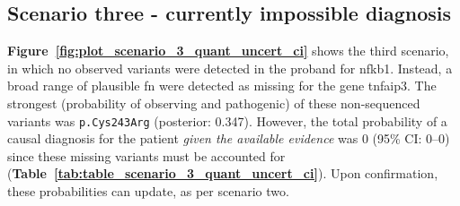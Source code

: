 \FloatBarrier
\subsection{Scenario three - currently impossible diagnosis}

\textbf{Figure~\ref{fig:plot_scenario_3_quant_uncert_ci}} shows the third scenario, in which no observed variants were detected in the proband for \ac{nfkb1}. 
Instead, a broad range of plausible \ac{fn} were detected as missing for the gene \ac{tnfaip3}.
The strongest (probability of observing and pathogenic) of these non-sequenced variants was \texttt{p.Cys243Arg} (posterior: 0.347). 
However, the total probability of a causal diagnosis for the patient \emph{given the available evidence} was 0 (95\% CI: 0--0) since these missing variants must be accounted for (\textbf{Table~\ref{tab:table_scenario_3_quant_uncert_ci}}). 
Upon confirmation, these probabilities can update, as per scenario two.


